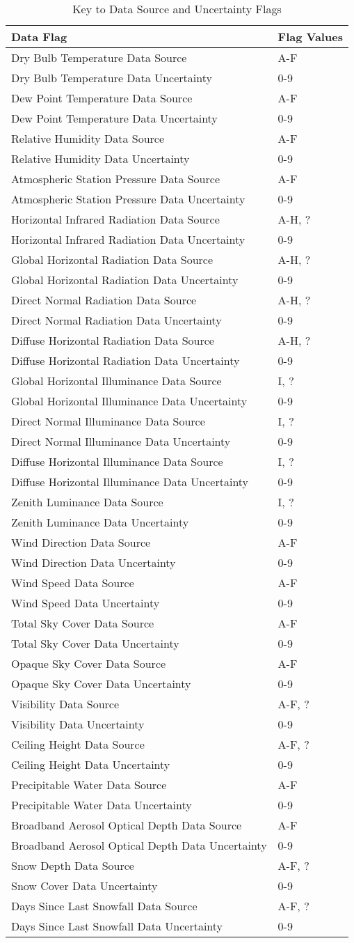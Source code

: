 \begin{longtable}[c]{@{}ll@{}}
\caption{Key to Data Source and Uncertainty Flags \protect \label{table:key-to-data-source-and-uncertainty-flags}}\\
\toprule 
Data Flag & Flag Values \tabularnewline \midrule
\endhead
Dry Bulb Temperature Data Source & A-F \tabularnewline
Dry Bulb Temperature Data Uncertainty & 0-9 \tabularnewline
Dew Point Temperature Data Source & A-F \tabularnewline
Dew Point Temperature Data Uncertainty & 0-9 \tabularnewline
Relative Humidity Data Source & A-F \tabularnewline
Relative Humidity Data Uncertainty & 0-9 \tabularnewline
Atmospheric Station Pressure Data Source & A-F \tabularnewline
Atmospheric Station Pressure Data Uncertainty & 0-9 \tabularnewline
Horizontal Infrared Radiation Data Source & A-H, ? \tabularnewline
Horizontal Infrared Radiation Data Uncertainty & 0-9 \tabularnewline
Global Horizontal Radiation Data Source & A-H, ? \tabularnewline
Global Horizontal Radiation Data Uncertainty & 0-9 \tabularnewline
Direct Normal Radiation Data Source & A-H, ? \tabularnewline
Direct Normal Radiation Data Uncertainty & 0-9 \tabularnewline
Diffuse Horizontal Radiation Data Source & A-H, ? \tabularnewline
Diffuse Horizontal Radiation Data Uncertainty & 0-9 \tabularnewline
Global Horizontal Illuminance Data Source & I, ? \tabularnewline
Global Horizontal Illuminance Data Uncertainty & 0-9 \tabularnewline
Direct Normal Illuminance Data Source & I, ? \tabularnewline
Direct Normal Illuminance Data Uncertainty & 0-9 \tabularnewline
Diffuse Horizontal Illuminance Data Source & I, ? \tabularnewline
Diffuse Horizontal Illuminance Data Uncertainty & 0-9 \tabularnewline
Zenith Luminance Data Source & I, ? \tabularnewline
Zenith Luminance Data Uncertainty & 0-9 \tabularnewline
Wind Direction Data Source & A-F \tabularnewline
Wind Direction Data Uncertainty & 0-9 \tabularnewline
Wind Speed Data Source & A-F \tabularnewline
Wind Speed Data Uncertainty & 0-9 \tabularnewline
Total Sky Cover Data Source & A-F \tabularnewline
Total Sky Cover Data Uncertainty & 0-9 \tabularnewline
Opaque Sky Cover Data Source & A-F \tabularnewline
Opaque Sky Cover Data Uncertainty & 0-9 \tabularnewline
Visibility Data Source & A-F, ? \tabularnewline
Visibility Data Uncertainty & 0-9 \tabularnewline
Ceiling Height Data Source & A-F, ? \tabularnewline
Ceiling Height Data Uncertainty & 0-9 \tabularnewline
Precipitable Water Data Source & A-F \tabularnewline
Precipitable Water Data Uncertainty & 0-9 \tabularnewline
Broadband Aerosol Optical Depth Data Source & A-F \tabularnewline
Broadband Aerosol Optical Depth Data Uncertainty & 0-9 \tabularnewline
Snow Depth Data Source & A-F, ? \tabularnewline
Snow Cover Data Uncertainty & 0-9 \tabularnewline
Days Since Last Snowfall Data Source & A-F, ? \tabularnewline
Days Since Last Snowfall Data Uncertainty & 0-9 \tabularnewline
\bottomrule
\end{longtable}

